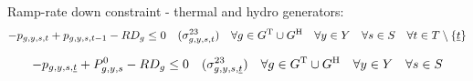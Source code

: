 \documentclass{article}
\begin{document}
%
%
%
%
%
%
%
Ramp-rate down constraint - thermal and hydro generators:
\begin{equation}
	- \vPower + \vPower[\iGenerator,\iYear,\iScenario,\iInterval-1] - \cRampRateDown \leq 0 \quad (\dRampRateDown) \quad \forall \iGenerator \in \sGeneratorsThermal \cup \sGeneratorsHydro \quad \forall \iYear \in \sYears \quad \forall \iScenario \in \sScenarios \quad \forall \iInterval \in \sIntervals \setminus \{\iIntervalStart\}
\end{equation}

\begin{equation}
- \vPower[\iGenerator,\iYear,\iScenario,\iIntervalStart] + \cPowerInitial - \cRampRateDown \leq 0 \quad (\dRampRateDown[\iGenerator,\iYear,\iScenario,\iIntervalStart]) \quad \forall \iGenerator \in \sGeneratorsThermal \cup \sGeneratorsHydro \quad \forall \iYear \in \sYears \quad \forall \iScenario \in \sScenarios
\end{equation}
\end{document}
